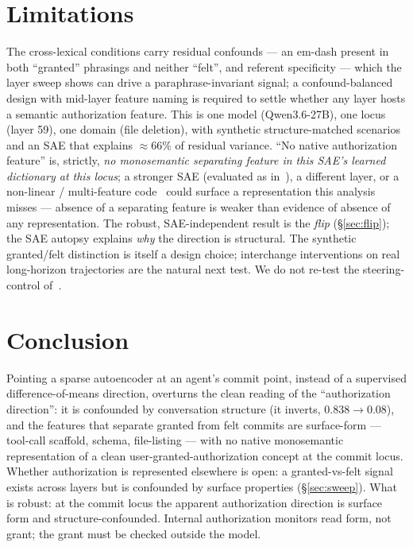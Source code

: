 \documentclass[11pt]{article}
\begin{document}
\section{Limitations}
The cross-lexical conditions carry residual confounds --- an em-dash present in both ``granted'' phrasings and neither ``felt'', and referent specificity --- which the layer sweep shows can drive a paraphrase-invariant signal; a confound-balanced design with mid-layer feature naming is required to settle whether any layer hosts a semantic authorization feature.
This is one model (Qwen3.6-27B), one locus (layer 59), one domain (file deletion), with synthetic
structure-matched scenarios and an SAE that explains $\approx 66\%$ of residual variance. ``No native
authorization feature'' is, strictly, \emph{no monosemantic separating feature in this SAE's learned
dictionary at this locus}; a stronger SAE (evaluated as in~\cite{saeeval}), a different layer, or a non-linear / multi-feature code~\cite{nonlinear} could
surface a representation this analysis misses --- absence of a separating feature is weaker than evidence of
absence of any representation. The robust, SAE-independent result is the \emph{flip} (\S\ref{sec:flip}); the
SAE autopsy explains \emph{why} the direction is structural. The synthetic granted/felt distinction is itself
a design choice; interchange interventions on real long-horizon trajectories are the natural next test. We do
not re-test the steering-control of~\cite{authdir}.

\section{Conclusion}
Pointing a sparse autoencoder at an agent's commit point, instead of a supervised difference-of-means
direction, overturns the clean reading of the ``authorization direction'': it is confounded by conversation
structure (it inverts, $0.838\to0.08$), and the features that separate granted from felt commits are
surface-form --- tool-call scaffold, schema, file-listing --- with no native monosemantic representation of
a clean user-granted-authorization concept at the commit locus. Whether authorization is represented elsewhere is open: a granted-vs-felt signal exists across layers but is confounded by surface properties (\S\ref{sec:sweep}). What is robust: at the commit locus the apparent authorization direction is surface form and structure-confounded. Internal authorization monitors
read form, not grant; the grant must be checked outside the model.
\end{document}
